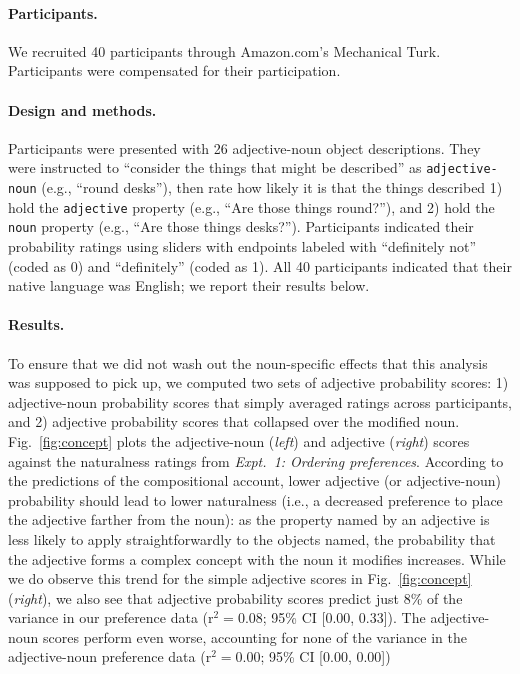 \documentclass[12pt]{article}
\newcommand{\jd}[1]{\textcolor{red}{[jd: #1]}}
\begin{document}
\paragraph{Participants.} We recruited 40 participants through Amazon.com's Mechanical Turk.  Participants were compensated for their participation.

\paragraph{Design and methods.} Participants were presented with 26 adjective-noun object descriptions. They were instructed to ``consider the things that might be described'' as \texttt{adjective-noun} (e.g., ``round desks''), then rate how likely it is that the things described 1) hold the \texttt{adjective} property (e.g., ``Are those things round?''), and 2) hold the \texttt{noun} property (e.g., ``Are those things desks?''). %
 Participants indicated their probability ratings using sliders with endpoints labeled with ``definitely not'' (coded as 0) and ``definitely'' (coded as 1). 
 All 40 participants indicated that their native language was English; we report their results below.

\paragraph{Results.} %
To ensure that we did not wash out the noun-specific effects that this analysis was supposed to pick up, we computed two sets of adjective probability scores: 1) adjective-noun probability scores that simply averaged ratings across participants, and 2) adjective probability scores that collapsed over the modified noun. 
Fig.~\ref{fig:concept} plots the adjective-noun (\emph{left}) and adjective (\emph{right}) scores against the naturalness ratings from \emph{Expt.~1: Ordering preferences}. According to the predictions of the compositional account, lower adjective (or adjective-noun) probability should lead to lower naturalness (i.e., a decreased preference to place the adjective farther from the noun): 
as the property named by an adjective is less likely to apply straightforwardly to the objects named, the probability that the adjective forms a complex concept with the noun it modifies increases. %
While we do observe this trend for the simple adjective scores in Fig.~\ref{fig:concept} (\emph{right}), we also see that adjective probability scores predict just 8\% of the variance in our preference data (r$^{2}=0.08$; 95\% CI [0.00,  0.33]). The adjective-noun scores perform even worse, accounting for none of the variance in the adjective-noun preference data (r$^{2}=0.00$; 95\% CI [0.00,  0.00])
\end{document}
